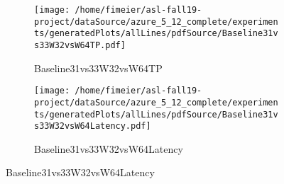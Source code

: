 \documentclass[11pt,a4paper]{article}
\begin{document}
\begin{figure}
	\begin{subfigure}[t]{.5\textwidth}
		\centering
		\texttt{[image: /home/fimeier/asl-fall19-project/dataSource/azure\_5\_12\_complete/experiments/generatedPlots/allLines/pdfSource/Baseline31vs33W32vsW64TP.pdf]}
		\caption{Baseline31vs33W32vsW64TP}
	\end{subfigure}
	\hfill
\begin{subfigure}[t]{0.5\textwidth}
		\centering
		\texttt{[image: /home/fimeier/asl-fall19-project/dataSource/azure\_5\_12\_complete/experiments/generatedPlots/allLines/pdfSource/Baseline31vs33W32vsW64Latency.pdf]}
		\caption{Baseline31vs33W32vsW64Latency}
	\end{subfigure}
	
	\medskip
\end{figure}
\end{document}
